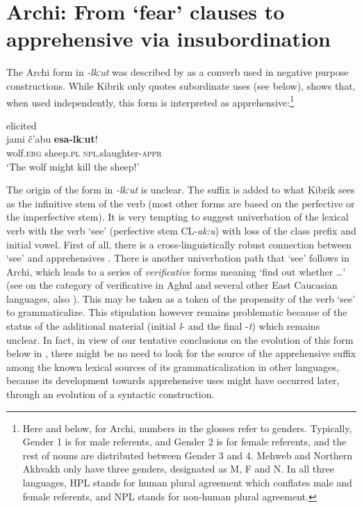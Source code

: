 \documentclass[output=paper,colorlinks,citecolor=brown]{langscibook}
\begin{document}
\section{Archi: From `fear' clauses to apprehensive via insubordination}
\label{sec:Archi}
 
The Archi form in \textit{-lkːut} was described by \citet[292]{Kibrik1977} as a converb used in negative purpose constructions. While Kibrik only quotes subordinate uses (see  below), \citet{Dobrushina2006cyrillic} shows that, when used independently, this form is interpreted as apprehensive:\footnote{Here and below, for Archi, numbers in the glosses refer to genders. Typically, Gender 1 is for male referents, and Gender 2 is for female referents, and the rest of nouns are distributed between Gender 3 and 4. Mehweb and Northern Akhvakh only have three genders, designated as M, F and N. In all three languages, HPL stands for human plural agreement which conflates male and female referents, and NPL stands for non-human plural agreement.}


\ea \label{ex:DD1} \textnormal{elicited} \\
\gll jami č'abu \textbf{esa-lkːut}! \\
wolf.\textsc{erg} sheep.\textsc{pl} \textsc{npl}.slaughter-\textsc{appr} \\
\glt `The wolf might kill the sheep!' \\
\z

The origin of the form in \textit{-lkːut} is unclear. The suffix is added to what Kibrik sees as the infinitive stem of the verb (most other forms are based on the perfective or the imperfective stem). It is very tempting to suggest univerbation of the lexical verb with the verb `see' (perfective stem \textsc{CL}-\textit{ak:u}) with loss of the class prefix and initial vowel. First of all, there is a cross-linguistically robust connection between `see' and apprehensives \citep{ lichtenberk1995,Dobrushina2006cyrillic}. There is another univerbation path that `see' follows in Archi, which leads to a series of \textit{verificative} forms meaning `find out whether  \ldots' (see \citealt{Maisak2016} on the category of verificative in Aghul and several other East Caucasian languages, also \citealt{Kibrik1977}). This may be taken as a token of the propensity of the verb `see' to grammaticalize. This stipulation however remains problematic because of the status of the additional material (initial \textit{l}- and the final \nobreakdash-\textit{t}) which remains unclear. In fact, in view of our tentative conclusions on the evolution of this form below in , there might be no need to look for the source of the apprehensive suffix among the known lexical sources of its grammaticalization in other languages, because its development towards apprehensive uses might have occurred later, through an evolution of a syntactic construction.   
\end{document}
